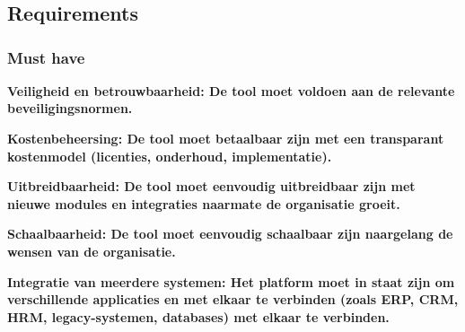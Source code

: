 \chapter{}
\label{ch:Zapier}

\section{Requirements}%
\label{RequirementsZapier}

\subsection{Must have}%
\label{MustHaveZapier}

\textbf{Veiligheid en betrouwbaarheid: De tool moet voldoen aan de relevante beveiligingsnormen.}

\vspace{\baselineskip}

\vspace{\baselineskip}

\textbf{Kostenbeheersing: De tool moet betaalbaar zijn met een transparant kostenmodel (licenties, onderhoud, implementatie).}

\vspace{\baselineskip}



\vspace{\baselineskip}

\textbf{Uitbreidbaarheid: De tool moet eenvoudig uitbreidbaar zijn met nieuwe modules en integraties naarmate de organisatie groeit.}

\vspace{\baselineskip}



\vspace{\baselineskip}

\textbf{Schaalbaarheid: De tool moet eenvoudig schaalbaar zijn naargelang de wensen van de organisatie.}

\vspace{\baselineskip}



\vspace{\baselineskip}

\textbf{Integratie van meerdere systemen: Het platform moet in staat zijn om verschillende applicaties en met elkaar te verbinden (zoals ERP, CRM, HRM, legacy-systemen, databases) met elkaar te verbinden.}

